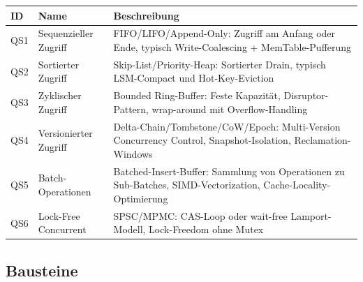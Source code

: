 \begin{scriptsize}
\begin{longtable}{@{}>{\raggedright\arraybackslash}p{1.8cm} >{\raggedright\arraybackslash}p{3.2cm} >{\raggedright\arraybackslash}p{8.5cm}@{}}
\toprule
ID & Name & Beschreibung \\
\midrule
\endhead%
QS1 & Sequenzieller Zugriff & FIFO/\allowbreak{}LIFO/\allowbreak{}Append-Only: Zugriff am Anfang oder Ende, typisch Write-Coalescing + Mem\allowbreak{}Table-Pufferung \\
QS2 & Sortierter Zugriff & Skip-List/\allowbreak{}Priority-Heap: Sortierter Drain, typisch LSM-Compact und Hot-Key-Eviction \\
QS3 & Zyklischer Zugriff & Bounded Ring-Buffer: Feste Kapazität, Disruptor-Pattern, wrap-around mit Overflow-Handling \\
QS4 & Versionierter Zugriff & Delta-Chain/\allowbreak{}Tombstone/\allowbreak{}Co\allowbreak{}W/\allowbreak{}Epoch: Multi-Version Concurrency Control, Snapshot-Isolation, Reclamation-Windows \\
QS5 & Batch-Operationen & Batched-Insert-Buffer: Sammlung von Operationen zu Sub-Batches, SIMD-Vectorization, Cache-Locality-Optimierung \\
QS6 & Lock-Free Concurrent & SPSC/\allowbreak{}MPMC\@: CAS-Loop oder wait-free Lamport-Modell, Lock-Freedom ohne Mutex \\
\bottomrule
\end{longtable}
\end{scriptsize}

\subsection*{Bausteine}

